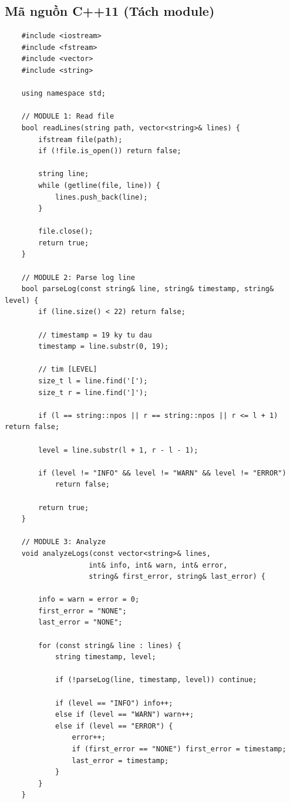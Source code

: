 \subsection{Mã nguồn C++11 (Tách module)}
\begin{lstlisting}
    #include <iostream>
    #include <fstream>
    #include <vector>
    #include <string>

    using namespace std;

    // MODULE 1: Read file
    bool readLines(string path, vector<string>& lines) {
        ifstream file(path);
        if (!file.is_open()) return false;

        string line;
        while (getline(file, line)) {
            lines.push_back(line);
        }

        file.close();
        return true;
    }

    // MODULE 2: Parse log line
    bool parseLog(const string& line, string& timestamp, string& level) {
        if (line.size() < 22) return false;

        // timestamp = 19 ky tu dau
        timestamp = line.substr(0, 19);

        // tim [LEVEL]
        size_t l = line.find('[');
        size_t r = line.find(']');

        if (l == string::npos || r == string::npos || r <= l + 1) return false;

        level = line.substr(l + 1, r - l - 1);

        if (level != "INFO" && level != "WARN" && level != "ERROR")
            return false;

        return true;
    }

    // MODULE 3: Analyze
    void analyzeLogs(const vector<string>& lines,
                    int& info, int& warn, int& error,
                    string& first_error, string& last_error) {

        info = warn = error = 0;
        first_error = "NONE";
        last_error = "NONE";

        for (const string& line : lines) {
            string timestamp, level;

            if (!parseLog(line, timestamp, level)) continue;

            if (level == "INFO") info++;
            else if (level == "WARN") warn++;
            else if (level == "ERROR") {
                error++;
                if (first_error == "NONE") first_error = timestamp;
                last_error = timestamp;
            }
        }
    }


\end{lstlisting}
